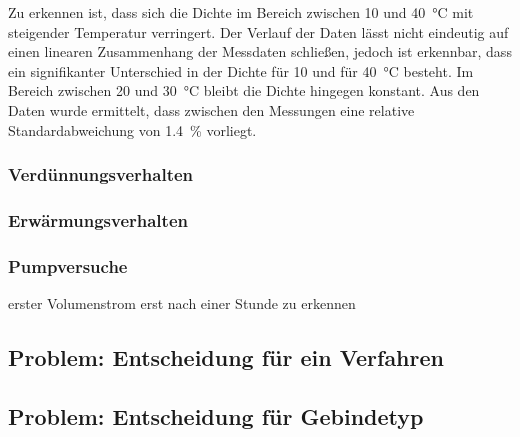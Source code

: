 \FloatBarrier 

Zu erkennen ist, dass sich die Dichte im Bereich zwischen 10 und \SI{40}{\celsius} mit steigender Temperatur verringert. Der Verlauf der Daten lässt nicht eindeutig auf einen linearen Zusammenhang der Messdaten schließen, jedoch ist erkennbar, dass ein signifikanter Unterschied in der Dichte für 10 und für \SI{40}{\celsius} besteht. Im Bereich zwischen 20 und \SI{30}{\celsius} bleibt die Dichte hingegen konstant. Aus den Daten wurde ermittelt, dass zwischen den Messungen eine relative Standardabweichung von \SI{1,4}{\percent} vorliegt.




\subsubsection{Verdünnungsverhalten}

\subsubsection{Erwärmungsverhalten}

\subsubsection{Pumpversuche}

erster Volumenstrom erst nach einer Stunde zu erkennen 



\subsection{Problem: Entscheidung für ein Verfahren}

\subsection{Problem: Entscheidung für Gebindetyp}

